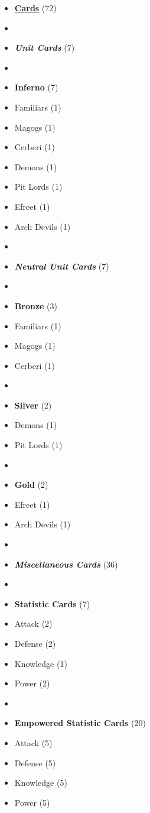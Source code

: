\begin{multicols*}{3}
\begin{itemize}[leftmargin=0pt, label={}, noitemsep]
  \item \textbf{\small{\underline{Cards}}} (72)
  \item
  \item \textbf{\emph{Unit Cards}} (7)
  \item
  \item \textbf{Inferno} (7)
  \item Familiars (1)
  \item Magogs (1)
  \item Cerberi (1)
  \item Demons (1)
  \item Pit Lords (1)
  \item Efreet (1)
  \item Arch Devils (1)
  \item
  \item \textbf{\emph{Neutral Unit Cards}} (7)
  \item
  \item \textbf{Bronze} (3)
  \item Familiars (1)
  \item Magogs (1)
  \item Cerberi (1)
  \item
  \item \textbf{Silver} (2)
  \item Demons (1)
  \item Pit Lords (1)
  \item
  \item \textbf{Gold} (2)
  \item Efreet (1)
  \item Arch Devils (1)
  \item
  \item \textbf{\emph{Miscellaneous Cards}} (36)
  \item
  \item \textbf{Statistic Cards} (7)
  \item Attack (2)
  \item Defense (2)
  \item Knowledge (1)
  \item Power (2)
  \item
  \item \textbf{Empowered Statistic Cards} (20)
  \item Attack (5)
  \item Defense (5)
  \item Knowledge (5)
  \item Power (5)

\end{itemize}
\end{multicols*}
